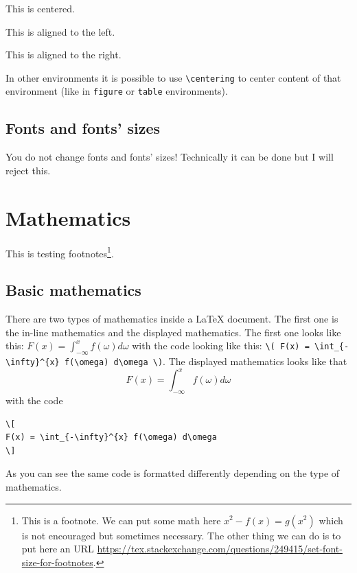 \documentclass[english, twoside, 12pt, a4paper]{article}
\theoremstyle{definition}
\theoremstyle{plain}
\theoremstyle{remark}
\begin{document}
\begin{center}
  This is centered.
\end{center}

\begin{flushleft}
  This is aligned to the left.
\end{flushleft}

\begin{flushright}
  This is aligned to the right. 
\end{flushright}

In other environments it is possible to use \verb+\centering+ to center content of that environment (like in \verb+figure+ or \verb+table+ environments).

\subsection{Fonts and fonts' sizes}

You do not change fonts and fonts' sizes! Technically it can be done but I will reject this.

\clearpage
\section{Mathematics}

This is testing footnotes\footnote{This is a footnote. We can put some math here \( x^2 - f(x) = g(x^2) \) which is not encouraged but sometimes necessary. The other thing we can do is to put here an URL \url{https://tex.stackexchange.com/questions/249415/set-font-size-for-footnotes}. }.

\subsection{Basic mathematics}

There are two types of mathematics inside a \LaTeX{} document. The first one is the in-line mathematics and the displayed mathematics. The first one looks like this: \( F(x) = \int_{-\infty}^{x} f(\omega) d\omega \) with the code looking like this: \verb!\( F(x) = \int_{-\infty}^{x} f(\omega) d\omega \)!. The displayed mathematics looks like that
\[
F(x) = \int_{-\infty}^{x} f(\omega) d\omega
\]
with the code
\begin{verbatim}
\[
F(x) = \int_{-\infty}^{x} f(\omega) d\omega
\]
\end{verbatim}
As you can see the same code is formatted differently depending on the type of mathematics.
\end{document}

